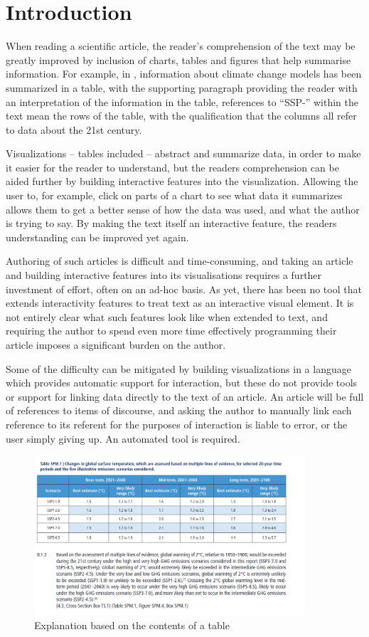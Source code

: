 \section{Introduction}

When reading a scientific article, the reader's comprehension of the text may
be greatly improved by inclusion of charts, tables and figures that help summarise information.
For example, in , information about climate change models
has been summarized in a table, with the supporting paragraph providing the reader
with an interpretation of the information in the table, references to ``SSP-'' within
the text mean the rows of the table, with the qualification that the columns all refer
to data about the 21st century.

Visualizations -- tables included -- abstract and summarize data, in order to make
it easier for the reader to understand, but the readers comprehension can be aided
further by building interactive features into the visualization. Allowing the user
to, for example, click on parts of a chart to see what data it summarizes allows
them to get a better sense of how the data was used, and what the author is trying
to say. By making the text itself an interactive feature, the readers understanding
can be improved yet again.

Authoring of such articles is difficult and time-consuming, and taking an article
and building interactive features into its visualisations requires a further investment
of effort, often on an ad-hoc basis. As yet, there has been no tool that extends
interactivity features to treat text as an interactive visual element. It is not
entirely clear what such features look like when extended to text, and requiring
the author to spend even more time effectively programming their article imposes
a significant burden on the author. 

Some of the difficulty can be mitigated by building visualizations in a language
which provides automatic support for interaction, but these do not provide tools
or support for linking data directly to the text of an article. An article will
be full of references to items of discourse, and asking the author to manually
link each reference to its referent for the purposes of interaction is liable to
error, or the user simply giving up. An automated tool is required. 

\begin{figure}
   \includegraphics[width=0.9\textwidth]{fig/ipcc-table-explanation.png}
   \caption{Explanation based on the contents of a table}
   \label{fig:table-explanation}
\end{figure}